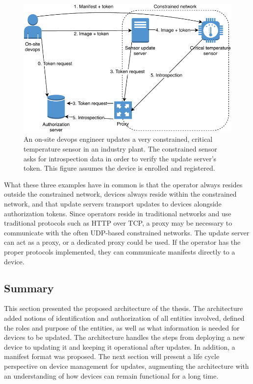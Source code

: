 \documentclass[0-thesis.tex]{subfiles}
\begin{document}
\begin{figure}[t]
    \caption[An on-site devops engineer updates a very constrained, critical temperature
    sensor in an industry plant.]
        {An on-site devops engineer updates a very constrained, critical temperature
                sensor in an industry plant. The constrained sensor asks for introspection
                data in order to verify the update server's token. This figure assumes the device is enrolled and registered.}
    \label{fig:industry}
    \includegraphics{images/use-case-industry.pdf}
\end{figure}

What these three examples have in common is that the operator always resides outside the
constrained network, devices always reside within the constrained network, and that update
servers transport updates to devices alongside authorization tokens. Since operators
reside in traditional networks and use traditional protocols such as HTTP over TCP, a
proxy may be necessary to communicate with the often UDP-based constrained networks. The
update server can act as a proxy, or a dedicated proxy could be used. If the operator has
the proper protocols implemented, they can communicate manifests directly to a device.

\subsection{Summary}
\label{ssec:architecture-summary}
This section presented the proposed architecture of the thesis. The architecture added
notions of identification and authorization of all entities involved, defined the roles
and purpose of the entities, as well as what information is needed for devices to be
updated. The architecture handles the steps from deploying a new device to updating it and
keeping it operational after updates. In addition, a manifest format was proposed. The next
section will present a life cycle perspective on device management for updates, augmenting
the architecture with an understanding of how devices can remain functional for a long
time.
\end{document}

